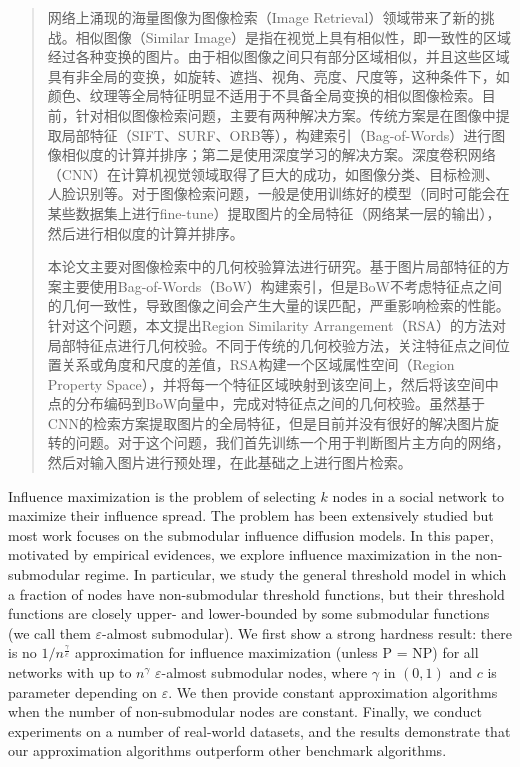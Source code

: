 
\begin{abstract}

网络上涌现的海量图像为图像检索（Image Retrieval）领域带来了新的挑战。相似图像（Similar Image）是指在视觉上具有相似性，即一致性的区域经过各种变换的图片。由于相似图像之间只有部分区域相似，并且这些区域具有非全局的变换，如旋转、遮挡、视角、亮度、尺度等，这种条件下，如颜色、纹理等全局特征明显不适用于不具备全局变换的相似图像检索。目前，针对相似图像检索问题，主要有两种解决方案。传统方案是在图像中提取局部特征（SIFT、SURF、ORB等），构建索引（Bag-of-Words）进行图像相似度的计算并排序；第二是使用深度学习的解决方案。深度卷积网络（CNN）在计算机视觉领域取得了巨大的成功，如图像分类、目标检测、人脸识别等。对于图像检索问题，一般是使用训练好的模型（同时可能会在某些数据集上进行fine-tune）提取图片的全局特征（网络某一层的输出），然后进行相似度的计算并排序。

本论文主要对图像检索中的几何校验算法进行研究。基于图片局部特征的方案主要使用Bag-of-Words（BoW）构建索引，但是BoW不考虑特征点之间的几何一致性，导致图像之间会产生大量的误匹配，严重影响检索的性能。针对这个问题，本文提出Region Similarity Arrangement（RSA）的方法对局部特征点进行几何校验。不同于传统的几何校验方法，关注特征点之间位置关系或角度和尺度的差值，RSA构建一个区域属性空间（Region Property Space），并将每一个特征区域映射到该空间上，然后将该空间中点的分布编码到BoW向量中，完成对特征点之间的几何校验。虽然基于CNN的检索方案提取图片的全局特征，但是目前并没有很好的解决图片旋转的问题。对于这个问题，我们首先训练一个用于判断图片主方向的网络，然后对输入图片进行预处理，在此基础之上进行图片检索。


\end{abstract}

\begin{englishabstract}

Influence maximization is the problem of selecting $k$ nodes in a social network to maximize their influence spread.
The problem has been extensively studied but most work focuses on the submodular influence diffusion models.
In this paper, motivated by empirical evidences, we explore influence maximization in the non-submodular regime.
In particular, we study the general threshold model in which a fraction of nodes have non-submodular threshold
	functions, but their threshold functions are closely upper- and lower-bounded by some submodular
	functions (we call them $\varepsilon$-almost submodular).
We first show a strong hardness result: there is no $1/n^{\frac{\gamma}{c}}$ approximation for influence maximization (unless P = NP)
	for all networks with up to $n^{\gamma}$ $\varepsilon$-almost submodular nodes, where $\gamma$ in $(0,1)$ 
	and $c$ is parameter depending on $\varepsilon$.
We then provide constant approximation algorithms when the number of non-submodular nodes are constant.
Finally, we conduct experiments on a number of real-world datasets, and the results demonstrate that our approximation algorithms
	outperform other benchmark algorithms.


\end{englishabstract}
